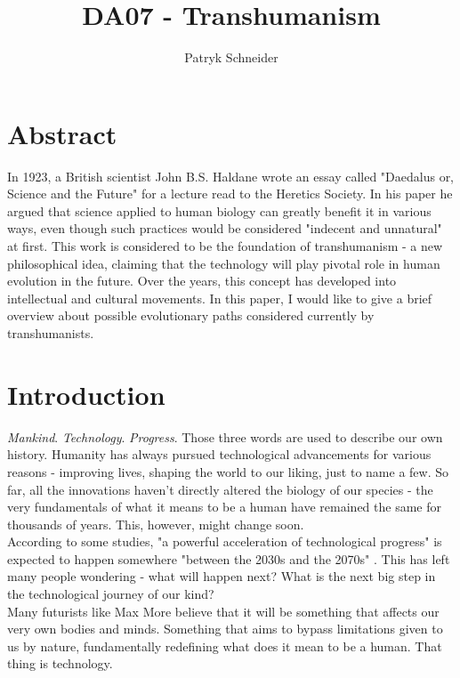 \documentclass[12pt]{article}
\begin{document}
\author{Patryk Schneider}
\title{DA07 - Transhumanism}
\maketitle

\section{Abstract}
	In 1923, a British scientist John B.S. Haldane wrote an essay called "Daedalus\; or, Science and the Future" for a lecture read to the Heretics Society. In his paper he argued that science applied to human biology can greatly benefit it in various ways, even though such practices would be considered "indecent and unnatural" \cite{haldane} at first. This work is considered to be the foundation of transhumanism - a new philosophical idea, claiming that the technology will play pivotal role in human evolution in the future. Over the years, this concept has developed into intellectual and cultural movements. In this paper, I would like to give a brief overview about possible evolutionary paths considered currently by transhumanists.

\newpage
\section{Introduction}
	\emph{Mankind}. \emph{Technology}. \emph{Progress}. Those three words are used to describe our own history. Humanity has always pursued technological advancements for various reasons - improving lives, shaping the world to our liking, just to name a few. So far, all the innovations haven't directly altered the biology of our species - the very fundamentals of what it means to be a human have remained the same for thousands of years. This, however, might change soon. 
	\\According to some studies, "a powerful acceleration of technological progress" is expected to happen somewhere "between the 2030s and the 2070s" \cite{progressRate}. This has left many people wondering - what will happen next? What is the next big step in the technological journey of our kind?
	\\Many futurists like Max More believe that it will be something that affects our very own bodies and minds. Something that aims to bypass limitations given to us by nature, fundamentally redefining what does it mean to be a human. That thing is technology.
\end{document}
